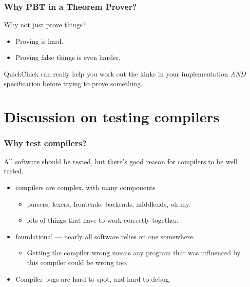 \documentclass{beamer}
\begin{document}
\begin{frame}
  \frametitle{Why PBT in a Theorem Prover?}

  Why not just prove things?

  \begin{itemize}
  \item Proving is hard.
    \pause
  \item Proving false things is even harder.
  \end{itemize}

  QuickChick can really help you work out the kinks in your
  implementation \emph{AND} specification before trying to prove something.
\end{frame}

\section{Discussion on testing compilers}

\begin{frame}
  \frametitle{Why test compilers?}

  All software should be tested, but there's good reason for compilers
  to be well tested.

  \begin{itemize}
  \item compilers are complex, with many components
          \begin{itemize}
          \item parsers, lexers, frontends, backends, middlends, oh my.
          \item lots of things that have to work correctly together.
          \end{itemize}
  \item foundational --- nearly all software relies on one somewhere.
    \begin{itemize}
    \item Getting the compiler wrong means any program that was
      influenced by this compiler could be wrong too.
    \end{itemize}
  \item Compiler bugs are hard to spot, and hard to debug.
  \end{itemize}
\end{frame}


  
\end{document}
